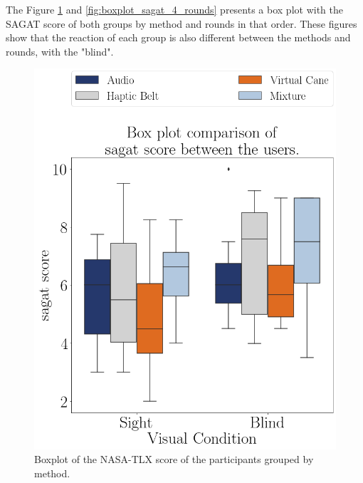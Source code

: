 The Figure \ref{fig:boxplot_sagat_4_scene} and \ref{fig:boxplot_sagat_4_rounds} presents a box plot with the SAGAT score of both groups by method and rounds in that order. These figures show that the reaction of each group is also different between the methods and rounds, with the "blind".

\begin{figure}[!htb]
    \centering
    \begin{minipage}{0.45\textwidth}
        \centering
        \includegraphics[width = 0.8\linewidth]{Resultados/Sagat/Figuras/png/boxplot_sagat_4_scene.png}
        \caption{Boxplot of the NASA-TLX score of the participants grouped by method.}
        \label{fig:boxplot_sagat_4_scene}
    \end{minipage}
    \begin{minipage}{0.45\textwidth}
        \centering

\end{minipage}
\end{figure}
